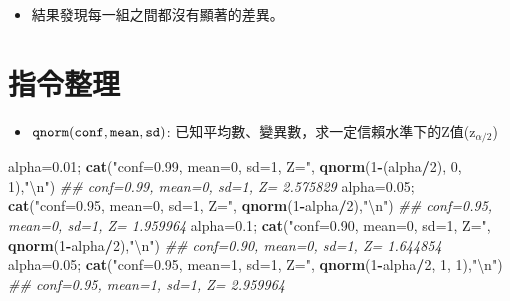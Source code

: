 \documentclass[hyperref,]{ctexart}
\newenvironment{Shaded}{\begin{snugshade}}{\end{snugshade}}
\newcommand{\CharTok}[1]{\textcolor[rgb]{0.31,0.60,0.02}{#1}}
\newcommand{\CommentTok}[1]{\textcolor[rgb]{0.56,0.35,0.01}{\textit{#1}}}
\newcommand{\DecValTok}[1]{\textcolor[rgb]{0.00,0.00,0.81}{#1}}
\newcommand{\FloatTok}[1]{\textcolor[rgb]{0.00,0.00,0.81}{#1}}
\newcommand{\KeywordTok}[1]{\textcolor[rgb]{0.13,0.29,0.53}{\textbf{#1}}}
\newcommand{\NormalTok}[1]{#1}
\newcommand{\OperatorTok}[1]{\textcolor[rgb]{0.81,0.36,0.00}{\textbf{#1}}}
\newcommand{\StringTok}[1]{\textcolor[rgb]{0.31,0.60,0.02}{#1}}
\providecommand{\tightlist}{%
  \setlength{\itemsep}{0pt}\setlength{\parskip}{0pt}}
\begin{document}
\begin{itemize}
\tightlist
\item
  結果發現每一組之間都沒有顯著的差異。
\end{itemize}

\hypertarget{ux6307ux4ee4ux6574ux7406}{%
\section{指令整理}\label{ux6307ux4ee4ux6574ux7406}}

\begin{itemize}
\tightlist
\item
  \(\tt{qnorm(conf, mean, sd)}\):
  已知平均數、變異數，求一定信賴水準下的Z值(\(\text{z}_{\alpha/2}\))
\end{itemize}

\begin{Shaded}
\begin{Highlighting}[]
\NormalTok{alpha=}\FloatTok{0.01}\NormalTok{; }\KeywordTok{cat}\NormalTok{(}\StringTok{"conf=0.99, mean=0, sd=1, Z="}\NormalTok{, }\KeywordTok{qnorm}\NormalTok{(}\DecValTok{1}\OperatorTok{-}\NormalTok{(alpha}\OperatorTok{/}\DecValTok{2}\NormalTok{), }\DecValTok{0}\NormalTok{, }\DecValTok{1}\NormalTok{),}\StringTok{"}\CharTok{\textbackslash{}n}\StringTok{"}\NormalTok{)}
\CommentTok{## conf=0.99, mean=0, sd=1, Z= 2.575829}
\NormalTok{alpha=}\FloatTok{0.05}\NormalTok{; }\KeywordTok{cat}\NormalTok{(}\StringTok{"conf=0.95, mean=0, sd=1, Z="}\NormalTok{, }\KeywordTok{qnorm}\NormalTok{(}\DecValTok{1}\OperatorTok{-}\NormalTok{alpha}\OperatorTok{/}\DecValTok{2}\NormalTok{),}\StringTok{"}\CharTok{\textbackslash{}n}\StringTok{"}\NormalTok{)}
\CommentTok{## conf=0.95, mean=0, sd=1, Z= 1.959964}
\NormalTok{alpha=}\FloatTok{0.1}\NormalTok{; }\KeywordTok{cat}\NormalTok{(}\StringTok{"conf=0.90, mean=0, sd=1, Z="}\NormalTok{, }\KeywordTok{qnorm}\NormalTok{(}\DecValTok{1}\OperatorTok{-}\NormalTok{alpha}\OperatorTok{/}\DecValTok{2}\NormalTok{),}\StringTok{"}\CharTok{\textbackslash{}n}\StringTok{"}\NormalTok{)}
\CommentTok{## conf=0.90, mean=0, sd=1, Z= 1.644854}
\NormalTok{alpha=}\FloatTok{0.05}\NormalTok{; }\KeywordTok{cat}\NormalTok{(}\StringTok{"conf=0.95, mean=1, sd=1, Z="}\NormalTok{, }\KeywordTok{qnorm}\NormalTok{(}\DecValTok{1}\OperatorTok{-}\NormalTok{alpha}\OperatorTok{/}\DecValTok{2}\NormalTok{, }\DecValTok{1}\NormalTok{, }\DecValTok{1}\NormalTok{),}\StringTok{"}\CharTok{\textbackslash{}n}\StringTok{"}\NormalTok{)}
\CommentTok{## conf=0.95, mean=1, sd=1, Z= 2.959964}
\end{Highlighting}
\end{Shaded}
\end{document}

